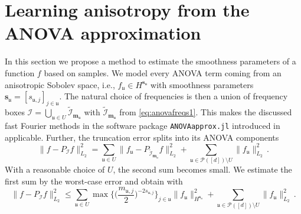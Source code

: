 \documentclass[a4paper]{scrartcl}
\numberwithin{equation}{section}
\renewcommand{\tilde}{\widetilde}
\begin{document}
 \section{Learning anisotropy from the ANOVA approximation}\label{sec:la} 

In this section we propose a method to estimate the smoothness parameters of a function $f$ based on samples.
We model every ANOVA term coming from an anisotropic Sobolev space, i.e., $f_{\mathfrak u}\in H^{\bm s_{\mathfrak u}}$ with smoothness parameters $\bm s_{\mathfrak u} = [s_{\mathfrak u,j}]_{j\in \mathfrak u}$.
The natural choice of frequencies is then a union of frequency boxes $\mathcal I = \bigcup_{\mathfrak u\in U}\tilde{\mathcal I}_{\bm m_{\mathfrak u}}$ with $\tilde{\mathcal I}_{\bm m_{\mathfrak u}}$ from \eqref{eq:anovafreqs1}.
This makes the discussed fast Fourier methods in the software package \texttt{ANOVAapprox.jl} introduced in  applicable.
Further, the truncation error splits into its ANOVA components
\begin{equation*}
    \| f - P_{\mathcal I} f \|_{L_2}^2
    = \sum_{\mathfrak u\in U} \|f_{\mathfrak u} - P_{\tilde{\mathcal I}_{\bm m_{\mathfrak u}}} f\|_{L_2}^2 + \sum_{\mathfrak u\in \mathcal P([d])\setminus U} \|f_{\mathfrak u}\|_{L_2}^2 \,.
\end{equation*}
With a reasonable choice of $U$, the second sum becomes small.
We estimate the first sum by the worst-case error and obtain with 
\begin{equation}\label{eq:behavior}
    \| f - P_{\mathcal I} f \|_{L_2}^2
    \le \sum_{\mathfrak u\in U} 
        \max \Big\{\Big(\frac{m_{\mathfrak u,j}}{2}\Big)^{-2s_{\mathfrak u,j}}\Big\}_{j\in \mathfrak u} \|f_{\mathfrak u}\|_{H^{\bm s_{\mathfrak u}}}^2
    + \sum_{\mathfrak u\in \mathcal P([d])\setminus U} \|f_{\mathfrak u}\|_{L_2}^2\, .
\end{equation}
\end{document}
